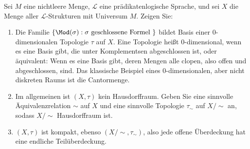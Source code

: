 
\begin{exercise}[132]

Sei $M$ eine nichtleere Menge, $\mathscr{L}$ eine prädikatenlogische Sprache, und
sei $X$ die Menge aller $\mathscr{L}$-Strukturen mit Universum $M$. Zeigen Sie:
\begin{enumerate}[label = \alph*.]
  \item Die Familie $\{\Mod(\sigma): \sigma \text{ geschlossene Formel }\}$
  bildet Basis einer $0$-dimensionalen Topologie $\tau$ auf $X$.
  Eine Topologie heißt $0$-dimensional, wenn es eine Basis gibt, die unter
  Komplementsen abgeschlossen ist, oder äquivalent: Wenn es eine Basis gibt,
  deren Mengen alle clopen, also offen und abgeschlossen, sind. Das klassische
  Beispiel eines $0$-dimensionalen, aber nicht diskreten Raums ist die Cantormenge.
  \item Im allgemeinen ist $(X, \tau)$ kein Hausdorffraum. Geben Sie eine sinnvolle
  Äquivalenzrelation $\sim$ auf $X$ und eine sinnvolle Topologie $\tau_{\sim}$
  auf $X/\sim$ an, sodass $X/\sim$ Hausdorffraum ist.
  \item $(X,\tau)$ ist kompakt, ebenso $(X/\sim,\tau_\sim)$, also jede offene
  Überdeckung hat eine endliche Teilüberdeckung.
\end{enumerate}

\end{exercise}


\begin{solution}

\phantom{}

\end{solution}

